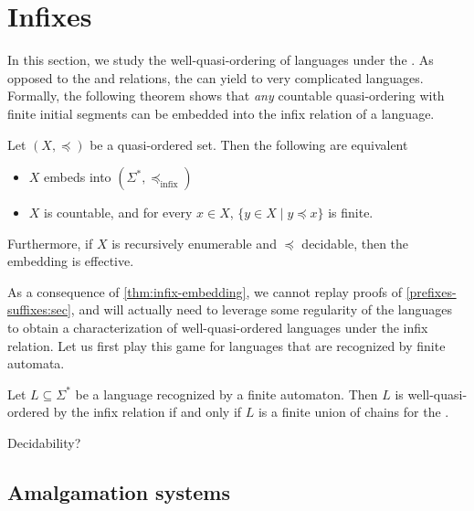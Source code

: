 
\section{Infixes}
\label{infixes:sec}


In this section, we study the well-quasi-ordering of languages under the
. As opposed to the  and  relations,
the  can yield to very complicated 
languages. Formally, the following theorem shows that \emph{any} countable
quasi-ordering with finite initial segments can be embedded into the infix
relation of a language.

\begin{theorem}
    \label{thm:infix-embedding}
    Let $(X, \preceq)$ be a quasi-ordered set.
    Then the following are equivalent
    \begin{itemize}
        \item $X$ embeds into $(\Sigma^*, \preceq_{\text{infix}})$
        \item $X$ is countable, and for every $x \in X$,
            $\{y \in X \mid y \preceq x\}$ is finite.
    \end{itemize}

    Furthermore, if $X$ is recursively enumerable and $\preceq$ decidable,
    then
    the embedding is effective.
\end{theorem}

As a consequence of \cref{thm:infix-embedding}, we cannot replay proofs of
\cref{prefixes-suffixes:sec}, and will actually need to leverage some
regularity of the languages to obtain a characterization of well-quasi-ordered
languages under the infix relation. Let us first play this game for languages
that are recognized by finite automata.

\begin{theorem}
    \label{thm:infix-finite-automata}
    Let $L \subseteq \Sigma^*$ be a language recognized by a finite automaton.
    Then $L$ is well-quasi-ordered by the infix relation if and only if $L$ is
    a finite union of chains for the .
\end{theorem}

\begin{corollary}
    Decidability?
\end{corollary}

\subsection{Amalgamation systems}

